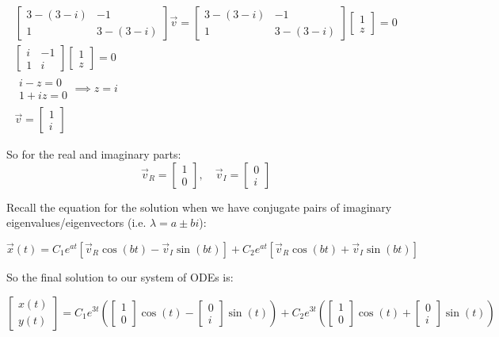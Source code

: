 \documentclass[letterpaper, fontsize=12pt]{scrartcl} %
\numberwithin{equation}{section} %
\numberwithin{figure}{section} %
\numberwithin{table}{section} %
\begin{document}
\begin{enumerate}
\begin{enumerate}[label = (\alph*)]
\begin{gather*}
\begin{bmatrix} 3 - (3 -i) & -1 \\ 1 & 3 - (3 -i) \end{bmatrix} \vec{v} = \begin{bmatrix} 3 - (3 -i) & -1 \\ 1 & 3 - (3 -i) \end{bmatrix} \begin{bmatrix} 1 \\ z \end{bmatrix} = 0 \\
\begin{bmatrix} i & -1 \\ 1 & i \end{bmatrix} \begin{bmatrix} 1 \\ z \end{bmatrix} = 0 \\
\begin{matrix} i - z = 0 \\ 1 + iz = 0 \end{matrix} \implies z = i \\
\vec{v} = \begin{bmatrix} 1 \\ i \end{bmatrix}
\end{gather*}

So for the real and imaginary parts:
\[ \vec{v}_R = \begin{bmatrix} 1 \\ 0 \end{bmatrix}, \quad \vec{v}_I = \begin{bmatrix} 0 \\ i \end{bmatrix} \]

Recall the equation for the solution when we have conjugate pairs of imaginary eigenvalues/eigenvectors (i.e. $\lambda = a \pm bi$):

\[ \vec{x}(t) = C_1 e^{at} \left[ \vec{v}_R \cos(bt) - \vec{v}_I \sin(bt)\right] + C_2 e^{at} \left[ \vec{v}_R \cos(bt) + \vec{v}_I \sin(bt)\right]  \]

So the final solution to our system of ODEs is:

\[ \begin{bmatrix} x(t) \\ y(t) \end{bmatrix} = C_1 e^{3t} \left( \begin{bmatrix} 1 \\ 0 \end{bmatrix} \cos(t) - \begin{bmatrix} 0 \\ i \end{bmatrix}\sin(t)\right) + C_2 e^{3t} \left( \begin{bmatrix} 1 \\ 0 \end{bmatrix} \cos(t) + \begin{bmatrix} 0 \\ i \end{bmatrix} \sin(t)\right)  \]


\end{enumerate}
\end{enumerate}
\end{document}
